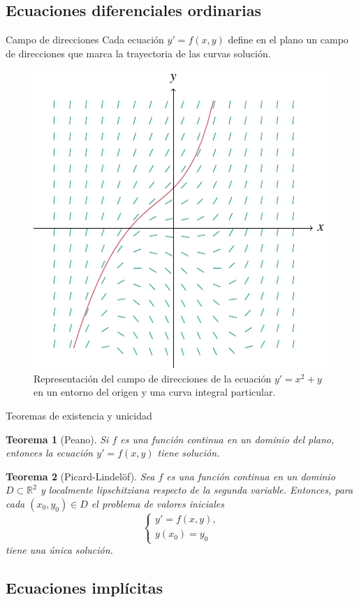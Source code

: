 \documentclass[10pt, spanish]{beamer}
\newtheorem{teorema}{Teorema}
\begin{document}
\subsection{Ecuaciones diferenciales ordinarias}

\begin{frame}{Campo de direcciones}
  Cada ecuación $y'=f(x,y)$ define en el plano un campo de direcciones que marca la trayectoria de las curvas solución.

  \begin{figure}
	\centering
	\includegraphics[width=.45\textwidth]{../figures/integral-curves-1}
	\caption{\footnotesize Representación del campo de direcciones de la ecuación $y'=x^2+y$ en un entorno del origen y una curva integral particular.}
\end{figure}
\end{frame}

\begin{frame}{Teoremas de existencia y unicidad}
\begin{teorema}[Peano]
  Si $f$ es una función continua en un dominio del plano, entonces la ecuación $y'=f(x,y)$ tiene solución.
\end{teorema}

\begin{teorema}[Picard-Lindelöf]
  Sea $f$ es una función continua en un dominio $D \subset \mathbb{R}^2$ y localmente lipschitziana respecto de la segunda variable. Entonces, para cada $(x_0,y_0)\in D$ el problema de valores iniciales
  \[
    \begin{cases}
      y'=f(x,y),\\
      y(x_0)=y_0
    \end{cases}
  \]
  tiene una única solución.
\end{teorema}
\end{frame}

\subsection{Ecuaciones implícitas}
\end{document}
